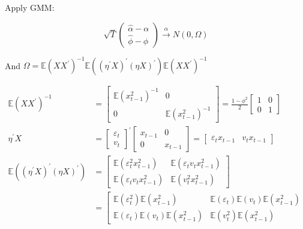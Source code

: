 {{\begin{enumerate}[label=(\alph*)]
{\begin{enumerate}[label=(\roman*)]
{Apply GMM:

$$
\sqrt{T}\left(\begin{array}{l}
\hat{\alpha}-\alpha \\
\hat{\phi}-\phi
\end{array}\right) \xrightarrow{\alpha} N(0, \Omega)
$$

And $\Omega=\mathbb{E}\left(X X^{\prime}\right)^{-1} \mathbb{E}\left(\left(\eta^{\prime} X\right)^{\prime}(\eta X)^{\prime}\right) \mathbb{E}\left(X X^{\prime}\right)^{-1}$

$$
\begin{aligned}
\mathbb{E}(X X^\prime)^{-1} & =\left[\begin{array}{cc}
\mathbb{E}\left(x_{t-1}^{2}\right)^{-1} & 0 \\
0 & \mathbb{E}\left(x_{t-1}^{2}\right)^{-1}
\end{array}\right]=\frac{1-\phi^{2}}{2}\left[\begin{array}{ll}
1 & 0 \\
0 & 1
\end{array}\right] \\
\eta^{\prime} X & =\left[\begin{array}{ll}
\varepsilon_{t} \\
v_{t}
\end{array}\right]^{\prime}\left[\begin{array}{cc}
x_{t-1} & 0 \\
0 & x_{t-1}
\end{array}\right]=\left[\begin{array}{ll}
\varepsilon_{t} x_{t-1} & v_{t} x_{t-1}
\end{array}\right] \\
\mathbb{E}\left(\left(\eta^{\prime} X\right)^{\prime}(\eta X)^{\prime}\right) & =\left[\begin{array}{ll}
\mathbb{E}\left(\varepsilon_{t}^{2} x_{t-1}^{2}\right) & \mathbb{E}\left(\varepsilon_{t} v_{t} x_{t-1}^{2}\right) \\
\mathbb{E}\left(\varepsilon_{t} v_{t} x_{t-1}^{2}\right) & \mathbb{E}\left(v_{t}^{2} x_{t-1}^{2}\right)
\end{array}\right] \\
& =\left[\begin{array}{ll}
\mathbb{E}\left(\varepsilon_{t}^{2}\right) \mathbb{E}\left(x_{t-1}^{2}\right) & \mathbb{E}\left(\varepsilon_{t}\right) \mathbb{E}\left(v_{t}\right) \mathbb{E}\left(x_{t-1}^{2}\right) \\
\mathbb{E}\left(\varepsilon_{t}\right) \mathbb{E}\left(v_{t}\right) \mathbb{E}\left(x_{t-1}^{2}\right) & \mathbb{E}\left(v_{t}^{2}\right) \mathbb{E}\left(x_{t-1}^{2}\right)

\end{array}
\end{aligned}$$}
\end{enumerate}}
\end{enumerate}}}
